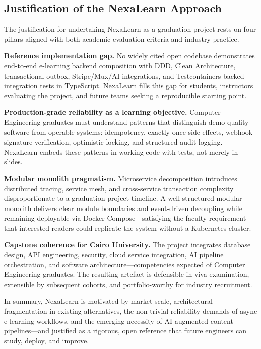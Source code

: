 \subsection{Justification of the NexaLearn Approach}
\label{subsec:justification}

The justification for undertaking NexaLearn as a graduation project rests on four pillars aligned with both academic evaluation criteria and industry practice.

\textbf{Reference implementation gap.} No widely cited open codebase demonstrates end-to-end e-learning backend composition with DDD, Clean Architecture, transactional outbox, Stripe/Mux/AI integrations, and Testcontainers-backed integration tests in TypeScript. NexaLearn fills this gap for students, instructors evaluating the project, and future teams seeking a reproducible starting point.

\textbf{Production-grade reliability as a learning objective.} Computer Engineering graduates must understand patterns that distinguish demo-quality software from operable systems: idempotency, exactly-once side effects, webhook signature verification, optimistic locking, and structured audit logging. NexaLearn embeds these patterns in working code with tests, not merely in slides.

\textbf{Modular monolith pragmatism.} Microservice decomposition introduces distributed tracing, service mesh, and cross-service transaction complexity disproportionate to a graduation project timeline. A well-structured modular monolith delivers clear module boundaries and event-driven decoupling while remaining deployable via Docker Compose---satisfying the faculty requirement that interested readers could replicate the system without a Kubernetes cluster.

\textbf{Capstone coherence for Cairo University.} The project integrates database design, API engineering, security, cloud service integration, AI pipeline orchestration, and software architecture---competencies expected of Computer Engineering graduates. The resulting artefact is defensible in viva examination, extensible by subsequent cohorts, and portfolio-worthy for industry recruitment.

In summary, NexaLearn is motivated by market scale, architectural fragmentation in existing alternatives, the non-trivial reliability demands of async e-learning workflows, and the emerging necessity of AI-augmented content pipelines---and justified as a rigorous, open reference that future engineers can study, deploy, and improve.
